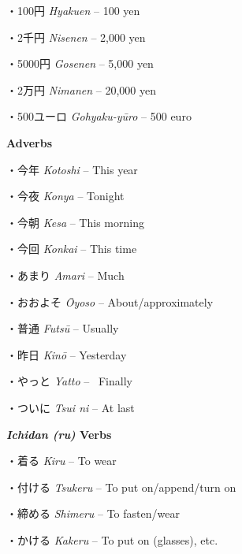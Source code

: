 \par{・100円 \emph{Hyakuen }– 100 yen }

\par{・2千円 \emph{Nisen\textquotesingle en }– 2,000 yen }

\par{・5000円 \emph{Gosen\textquotesingle en }– 5,000 yen }

\par{・2万円 \emph{Niman\textquotesingle en }– 20,000 yen }

\par{・500ユーロ \emph{Gohyaku-yūro }– 500 euro }

\par{\textbf{Adverbs }}

\par{・今年 \emph{Kotoshi }– This year }

\par{・今夜 \emph{Kon\textquotesingle ya }– Tonight }

\par{・今朝 \emph{Kesa }– This morning }

\par{・今回 \emph{Konkai }– This time }

\par{・あまり \emph{Amari }– Much }

\par{・おおよそ \emph{Ōyoso }– About\slash approximately }

\par{・普通 \emph{Futsū }– Usually }

\par{・昨日 \emph{Kinō }– Yesterday }

\par{・やっと \emph{Yatto }–  Finally }

\par{・ついに \emph{Tsui ni }– At last }

\par{\textbf{\emph{Ichidan (ru) }Verbs }}

\par{・着る \emph{Kiru }– To wear }

\par{・付ける \emph{Tsukeru }– To put on\slash append\slash turn on }

\par{・締める \emph{Shimeru }– To fasten\slash wear }

\par{・かける \emph{Kakeru }– To put on (glasses), etc. }


